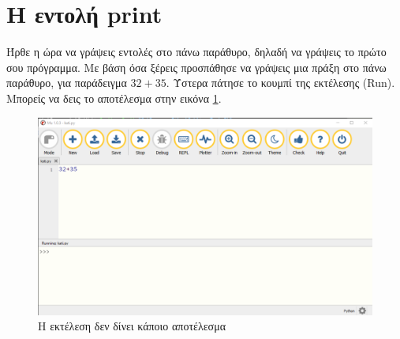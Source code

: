 \documentclass[b5paper,11pt,twoside,openleft]{memoir}
\begin{document}
\section{Η εντολή print}
Ήρθε η ώρα να γράψεις εντολές στο πάνω παράθυρο, δηλαδή να γράψεις το πρώτο σου πρόγραμμα.  Με βάση όσα ξέρεις προσπάθησε να γράψεις μια πράξη στο πάνω παράθυρο, για παράδειγμα $32+35$. Ύστερα πάτησε το κουμπί της εκτέλεσης (Run). Μπορείς να δεις το αποτέλεσμα στην εικόνα \ref{noprint}.
\begin{figure}
\includegraphics[width=\textwidth]{noprint.png}
\caption{Η εκτέλεση δεν δίνει κάποιο αποτέλεσμα}
\label{noprint}
\end{figure}
\end{document}
